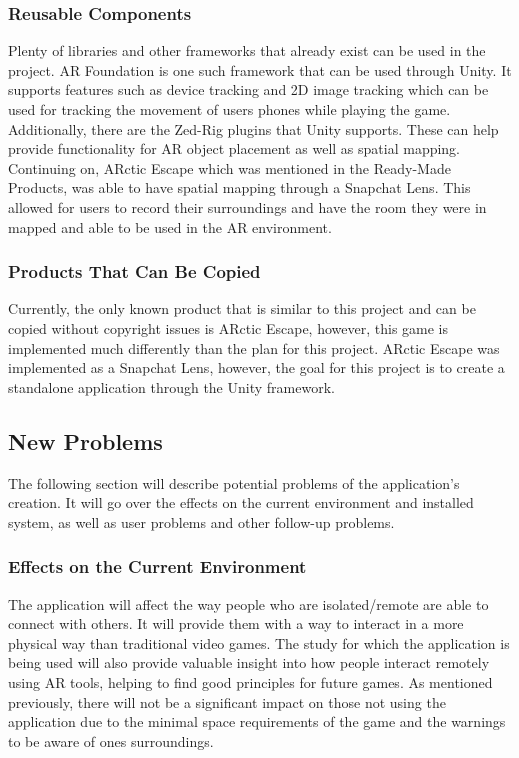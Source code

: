 \documentclass[12pt]{article}
\begin{document}
\subsubsection{Reusable Components}
Plenty of libraries and other frameworks that already exist can be used in the project. AR Foundation is one such framework that can be used through Unity. It supports features such as device tracking and 2D image tracking which can be used for tracking the movement of users phones while playing the game. Additionally, there are the Zed-Rig plugins that Unity supports. These can help provide functionality for AR object placement as well as spatial mapping. Continuing on, ARctic Escape which was mentioned in the Ready-Made Products, was able to have spatial mapping through a Snapchat Lens. This allowed for users to record their surroundings and have the room they were in mapped and able to be used in the AR environment.

\subsubsection{Products That Can Be Copied}
Currently, the only known product that is similar to this project and can be copied without copyright issues is ARctic Escape, however, this game is implemented much differently than the plan for this project. ARctic Escape was implemented as a Snapchat Lens, however, the goal for this project is to create a standalone application through the Unity framework.

\subsection{New Problems}
The following section will describe potential problems of the application's creation. It will go over the effects on the current environment and installed system, as well as user problems and other follow-up problems.

\subsubsection{Effects on the Current Environment}
The application will affect the way people who are isolated/remote are able to connect with others. It will provide them with a way to interact in a more physical way than traditional video games. The study for which the application is being used will also provide valuable insight into how people interact remotely using AR tools, helping to find good principles for future games. As mentioned previously, there will not be a significant impact on those not using the application due to the minimal space requirements of the game and the warnings to be aware of ones surroundings.
\end{document}
